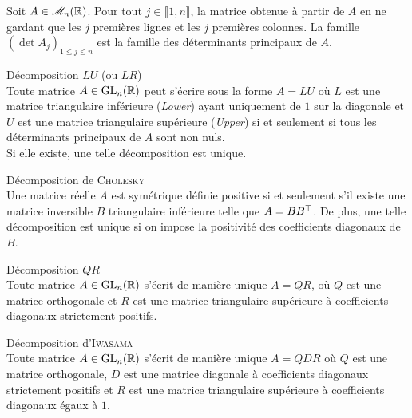 \begin{defi}
    Soit $A \in \mathscr{M}_n(\mathbb{R})$. Pour tout $j \in \llbracket 1, n \rrbracket$, la matrice obtenue à partir de $A$ en ne gardant que les $j$ premières lignes et les $j$ premières colonnes. La famille $(\det A_j)_{1 \leqslant j \leqslant n}$ est la famille des déterminants principaux de $A$.
\end{defi}


\begin{theo}
    Décomposition $LU$ (ou $LR$) \\
    Toute matrice $A \in \mathrm{GL}_n(\mathbb{R})$ peut s'écrire sous la forme $A = LU$ où $L$ est une matrice triangulaire inférieure (\emph{Lower}) ayant uniquement de $1$ sur la diagonale et $U$ est une matrice triangulaire supérieure (\emph{Upper}) si et seulement si tous les déterminants principaux de $A$ sont non nuls. \\
    Si elle existe, une telle décomposition est unique.
\end{theo}

\begin{theo}
    Décomposition de \textsc{Cholesky} \\
    Une matrice réelle $A$ est symétrique définie positive si et seulement s'il existe une matrice inversible $B$ triangulaire inférieure telle que $A = B B^\top$. De plus, une telle décomposition est unique si on impose la positivité des coefficients diagonaux de $B$.  
\end{theo}  

\begin{theo}
    Décomposition $QR$ \\
    Toute matrice $A \in \mathrm{GL}_n(\mathbb{R})$ s'écrit de manière unique $A = QR$, où $Q$ est une matrice orthogonale et $R$ est une matrice triangulaire supérieure à coefficients diagonaux strictement positifs. 
\end{theo}

\begin{corol}
    Décomposition d'\textsc{Iwasama} \\
    Toute matrice $A \in \mathrm{GL}_n(\mathbb{R})$ s'écrit de manière unique $A = QDR$ où $Q$ est une matrice orthogonale, $D$ est une matrice diagonale à coefficients diagonaux strictement positifs et $R$ est une matrice triangulaire supérieure à coefficients diagonaux égaux à $1$. 
\end{corol}

